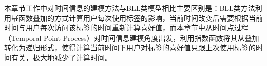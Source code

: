 本章节工作中对时间信息的建模方法与BLL类模型相比主要区别是：BLL类方法利用幂函数叠加的方式计算用户每次使用标签的影响，当前时间改变后需要根据当前时间与用户每次访问该标签的时间重新计算喜好值，而本章节中从时间点过程（Temporal Point Process）对时间信息建模角度出发，利用指数函数将其从叠加转化为递归形式，使得计算当前时间下用户对标签的喜好值只跟上次使用标签的时间有关，极大地减少了计算时间。




%
%


